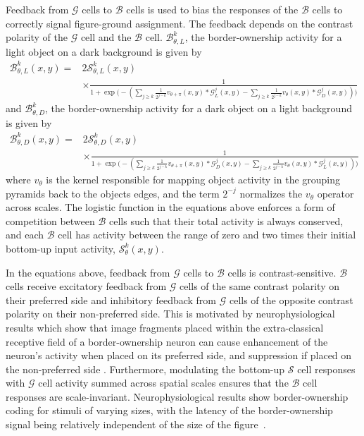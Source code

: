 Feedback from $\mathcal{G}$ cells to $\mathcal{B}$ cells is used to bias the responses of the $\mathcal{B}$ cells to correctly signal figure-ground assignment. The feedback depends on the contrast polarity of the $\mathcal{G}$ cell and the $\mathcal{B}$ cell. $\mathcal{B}^k_{\theta,L}$, the border-ownership activity for a light object on a dark background is given by
\begin{equation}
\begin{split}
\mathcal{B}^k_{\theta,L}(x,y) = &2\mathcal{S}^k_{\theta,L}(x,y)\\
            &\times\frac{1}{1+\exp\Big(-(\sum_{j\geq k}\frac{1}{2^{j-k}} v_{\theta+\pi}(x,y) \ast \mathcal{G}^j_{L}(x,y)-\sum_{j\geq k}\frac{1}{2^{j-k}} v_{\theta}(x,y) \ast \mathcal{G}^j_{D}(x,y))\Big)}
\end{split}
\label{eq:border-orientation1}
\end{equation}
and $\mathcal{B}^k_{\theta,D}$, the border-ownership activity for a dark object on a light background is given by
\begin{equation}
\begin{split}
\mathcal{B}^k_{\theta,D}(x,y) = &2\mathcal{S}^k_{\theta,D}(x,y)\\
            &\times\frac{1}{1+\exp\Big(-(\sum_{j\geq k}\frac{1}{2^{j-k}} v_{\theta+\pi}(x,y) \ast \mathcal{G}^j_{D}(x,y)-\sum_{j\geq k}\frac{1}{2^{j-k}} v_{\theta}(x,y) \ast \mathcal{G}^j_{L}(x,y))\Big)}
\end{split}
\label{eq:border-orientation2}
\end{equation}
where $v_{\theta}$ is the kernel responsible for mapping object activity in the grouping pyramids back to the objects edges, and the term $2^{-j}$ normalizes the $v_{\theta}$ operator across scales. The logistic function in the equations above enforces a form of competition between $\mathcal{B}$ cells such that their total activity is always conserved, and each $\mathcal{B}$ cell has activity between the range of zero and two times their initial bottom-up input activity, $\mathcal{S}^k_{\theta}(x,y)$.

In the equations above, feedback from $\mathcal{G}$ cells to $\mathcal{B}$ cells is contrast-sensitive. $\mathcal{B}$ cells receive excitatory feedback from $\mathcal{G}$ cells of the same contrast polarity on their preferred side and inhibitory feedback from $\mathcal{G}$ cells of the opposite contrast polarity on their non-preferred side. This is motivated by neurophysiological results which show that image fragments placed within the extra-classical receptive field of a border-ownership neuron can cause enhancement of the neuron's activity when placed on its preferred side, and suppression if placed on the non-preferred side \citep{Zhang_vonderHeydt10}. Furthermore, modulating the bottom-up $\mathcal{S}$ cell responses with $\mathcal{G}$ cell activity summed across spatial scales ensures that the $\mathcal{B}$ cell responses are scale-invariant. Neurophysiological results show border-ownership coding for stimuli of varying sizes, with the latency of the border-ownership signal being relatively independent of the size of the figure~\citep{Zhou_etal00,Sugihara_etal11}.

